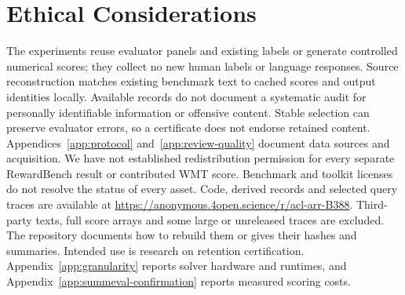 \documentclass[11pt]{article}
\begin{document}
\section*{Ethical Considerations}
The experiments reuse evaluator panels and existing labels or generate controlled numerical scores; they collect no new human labels or language responses. Source reconstruction matches existing benchmark text to cached scores and output identities locally. Available records do not document a systematic audit for personally identifiable information or offensive content. Stable selection can preserve evaluator errors, so a certificate does not endorse retained content. Appendices~\ref{app:protocol} and~\ref{app:review-quality} document data sources and acquisition. We have not established redistribution permission for every separate RewardBench result or contributed WMT score. Benchmark and toolkit licenses do not resolve the status of every asset. Code, derived records and selected query traces are available at \url{https://anonymous.4open.science/r/acl-arr-B388}. Third-party texts, full score arrays and some large or unreleased traces are excluded. The repository documents how to rebuild them or gives their hashes and summaries. Intended use is research on retention certification. Appendix~\ref{app:granularity} reports solver hardware and runtimes, and Appendix~\ref{app:summeval-confirmation} reports measured scoring costs.


\clearpage
\appendix
\renewcommand{\topfraction}{.95}\renewcommand{\bottomfraction}{.9}\renewcommand{\textfraction}{.05}\renewcommand{\floatpagefraction}{.8}\renewcommand{\dbltopfraction}{.95}\renewcommand{\dblfloatpagefraction}{.8}\setcounter{topnumber}{4}\setcounter{bottomnumber}{3}\setcounter{totalnumber}{8}\setcounter{dbltopnumber}{4}
\setcounter{dbltopnumber}{3}
\renewcommand{\dbltopfraction}{.9}
\renewcommand{\dblfloatpagefraction}{.6}

\end{document}
